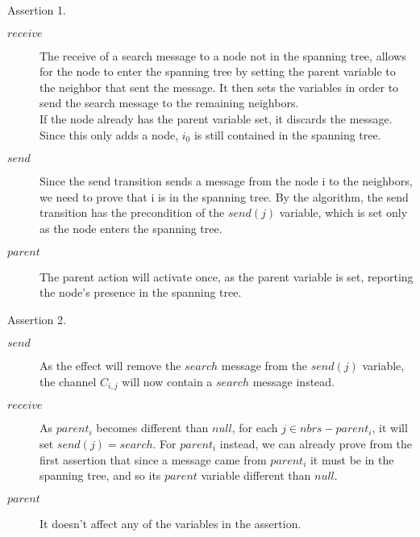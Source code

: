 \documentclass{article}
\begin{document}
    Assertion 1.
    \begin{description}
    \item[$receive$]{\small The receive of a search message to a node not in the spanning tree, allows for the node to enter the spanning tree by setting the parent variable to the neighbor that sent the message. It then sets the variables in order to send the search message to the remaining neighbors.\\
        If the node already has the parent variable set, it discards the message. 
    Since this only adds a node, $i_0$ is still contained in the spanning tree.}
    \item[$send$]{Since the send transition sends a message from the node i to the neighbors, we need
        to prove that i is in the spanning tree. By the algorithm, the send transition has the precondition of the $send(j)$ variable,
    which is set only as the node enters the spanning tree.}
    \item[$parent$]{The parent action will activate once, as the parent variable is set, reporting the node's presence in the spanning tree.}
    \end{description}

    Assertion 2.


    \begin{description}
    \item[$send$]{As the effect will remove the $search$ message from the $send(j)$ variable, the channel $C_{i,j}$ will now contain a $search$ message instead.}
    \item[$receive$]{As $parent_i$ becomes different than $null$, for each $j \in nbrs - {parent_i}$,
    it will set $send(j) = search$. For $parent_i$ instead, we can already prove from the first assertion that since a message came from $parent_i$ it must be in the spanning tree, and so its $parent$ variable different than $null$.}
    \item[$parent$]{It doesn't affect any of the variables in the assertion.}
    \end{description}
\end{document}
